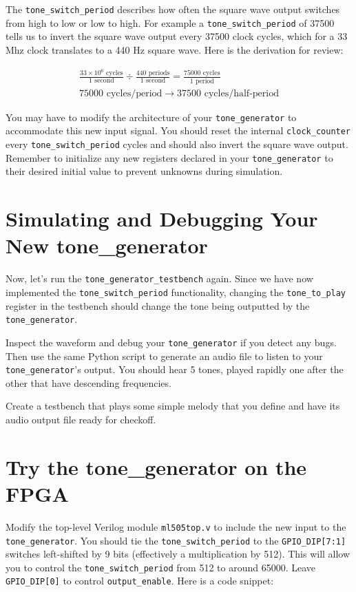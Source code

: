 \documentclass[11pt]{article}
\begin{document}
The \verb|tone_switch_period| describes how often the square wave output switches from high to low or low to high. For example a \verb|tone_switch_period| of 37500 tells us to invert the square wave output every 37500 clock cycles, which for a 33 Mhz clock translates to a 440 Hz square wave. Here is the derivation for review:

\begin{eqnarray}
	\frac{33 \times 10^6 \text{ cycles}}{1 \text{ second}} \div \frac{440 \text{ periods}}{1 \text{ second}} = \frac{75000 \text{ cycles}}{1 \text{ period}} \nonumber \\
	75000 \text{ cycles/period} \rightarrow 37500 \text{ cycles/half-period} \nonumber
\end{eqnarray}

You may have to modify the architecture of your \verb|tone_generator| to accommodate this new input signal. You should reset the internal \verb|clock_counter| every \verb|tone_switch_period| cycles and should also invert the square wave output. Remember to initialize any new registers declared in your \verb|tone_generator| to their desired initial value to prevent unknowns during simulation.

\section{Simulating and Debugging Your New tone\_generator}

Now, let's run the \verb|tone_generator_testbench| again. Since we have now implemented the \verb|tone_switch_period| functionality, changing the \verb|tone_to_play| register in the testbench should change the tone being outputted by the \verb|tone_generator|.

Inspect the waveform and debug your \verb|tone_generator| if you detect any bugs. Then use the same Python script to generate an audio file to listen to your \verb|tone_generator|'s output. You should hear 5 tones, played rapidly one after the other that have descending frequencies.

Create a testbench that plays some simple melody that you define and have its audio output file ready for checkoff.

\section{Try the tone\_generator on the FPGA}
Modify the top-level Verilog module \verb|ml505top.v| to include the new input to the \verb|tone_generator|. You should tie the \verb|tone_switch_period| to the \verb|GPIO_DIP[7:1]| switches left-shifted by 9 bits (effectively a multiplication by 512). This will allow you to control the \verb|tone_switch_period| from 512 to around 65000. Leave \verb|GPIO_DIP[0]| to control \verb|output_enable|. Here is a code snippet:
\end{document}
